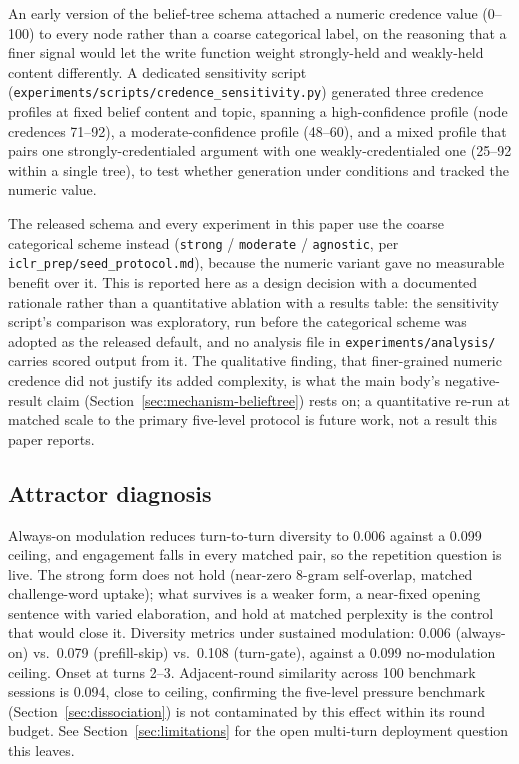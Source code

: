 An early version of the belief-tree schema attached a numeric credence value (0--100)
to every node rather than a coarse categorical label, on the reasoning that a finer
signal would let the write function weight strongly-held and weakly-held content
differently. A dedicated sensitivity script
(\texttt{experiments/scripts/credence\_sensitivity.py}) generated three credence
profiles at fixed belief content and topic, spanning a high-confidence profile
(node credences 71--92), a moderate-confidence profile (48--60), and a mixed profile
that pairs one strongly-credentialed argument with one weakly-credentialed one
(25--92 within a single tree), to test whether generation under conditions \condB{}
and \condD{} tracked the numeric value.

The released schema and every experiment in this paper use the coarse categorical
scheme instead (\texttt{strong} / \texttt{moderate} / \texttt{agnostic}, per
\texttt{iclr\_prep/seed\_protocol.md}), because the numeric variant gave no measurable
benefit over it. This is reported here as a design decision with a documented rationale
rather than a quantitative ablation with a results table: the sensitivity script's
comparison was exploratory, run before the categorical scheme was adopted as the
released default, and no analysis file in \texttt{experiments/analysis/} carries scored
output from it. The qualitative finding, that finer-grained numeric credence did not
justify its added complexity, is what the main body's negative-result claim
(Section~\ref{sec:mechanism-belieftree}) rests on; a quantitative re-run at matched
scale to the primary five-level protocol is future work, not a result this paper
reports.

\subsection{Attractor diagnosis}
\label{app:attractor}
Always-on modulation reduces turn-to-turn diversity to 0.006 against a 0.099 ceiling, and
engagement falls in every matched pair, so the repetition question is live. The strong form
does not hold (near-zero 8-gram self-overlap, matched challenge-word uptake); what survives is
a weaker form, a near-fixed opening sentence with varied elaboration, and hold at matched
perplexity is the control that would close it.
Diversity metrics under sustained modulation: 0.006 (always-on) vs.\ 0.079
(prefill-skip) vs.\ 0.108 (turn-gate), against a 0.099 no-modulation ceiling. Onset at
turns 2--3. Adjacent-round similarity across 100 benchmark sessions is 0.094, close to
ceiling, confirming the five-level pressure benchmark (Section~\ref{sec:dissociation})
is not contaminated by this effect within its round budget. See
Section~\ref{sec:limitations} for the open multi-turn deployment question this leaves.

